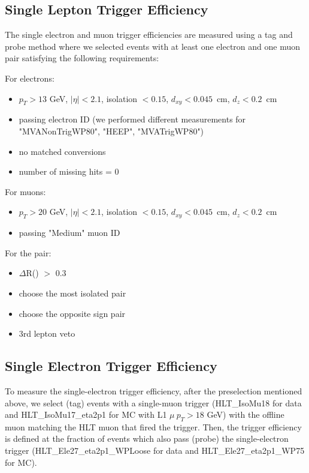 \subsection{Single Lepton Trigger Efficiency}\label{sec:lepTrigger}
The single electron and muon trigger efficiencies are measured
using a tag and probe method where we selected events with at 
least one electron and one muon pair satisfying the following
requirements:

For electrons:
\begin{itemize}
  \item $p_T > 13$ GeV, $|\eta| < 2.1$, isolation $< 0.15$, $d_{xy}<0.045$~cm, $d_{z}<0.2$~cm
  \item passing electron ID (we performed different measurements for "MVANonTrigWP80", "HEEP", "MVATrigWP80")
  \item no matched conversions
  \item number of missing hits = 0
\end{itemize}

For muons:
\begin{itemize}
  \item $p_T > 20$ GeV, $|\eta| < 2.1$, isolation $< 0.15$, $d_{xy}<0.045$~cm, $d_{z}<0.2$~cm
  \item passing "Medium" muon ID
\end{itemize}

For the pair:
\begin{itemize}
  \item $\Delta$R(\emu) $>$ 0.3
  \item choose the most isolated pair
  \item choose the opposite sign pair
  \item 3rd lepton veto
\end{itemize}

\subsection{Single Electron Trigger Efficiency}\label{sec:eleTrigger}
To measure the single-electron trigger efficiency, after the
preselection mentioned above, we select (tag) events with a
single-muon trigger (HLT\_IsoMu18 for data and HLT\_IsoMu17\_eta2p1
for MC with L1 $\mu~p_{T} > 18$ GeV) with the offline muon matching
the HLT muon that fired the trigger.  Then, the trigger efficiency is
defined at the fraction of events which also pass (probe) the
single-electron trigger (HLT\_Ele27\_eta2p1\_WPLoose for data and
HLT\_Ele27\_eta2p1\_WP75 for MC).

